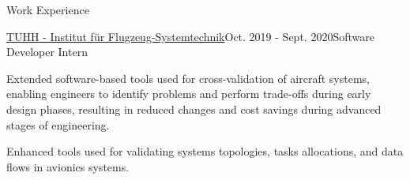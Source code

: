\documentclass{resume} %
\begin{document}
\begin{rSection}{Work Experience}
\begin{rSubsection}{\href{https://www.fst.tu-harburg.de/institut/willkommen}{TUHH - Institut f\"ur Flugzeug-Systemtechnik}}{Oct. 2019 - Sept. 2020}{Software Developer Intern}{}
\item Extended software-based tools used for cross-validation of aircraft systems, enabling engineers to identify problems and perform trade-offs during early design phases, resulting in reduced changes and cost savings during advanced stages of engineering.
\item Enhanced tools used for validating systems topologies, tasks allocations, and data flows in avionics systems.
\end{rSubsection}

\end{rSection}

\vspace{-0.3cm}
\end{document}
